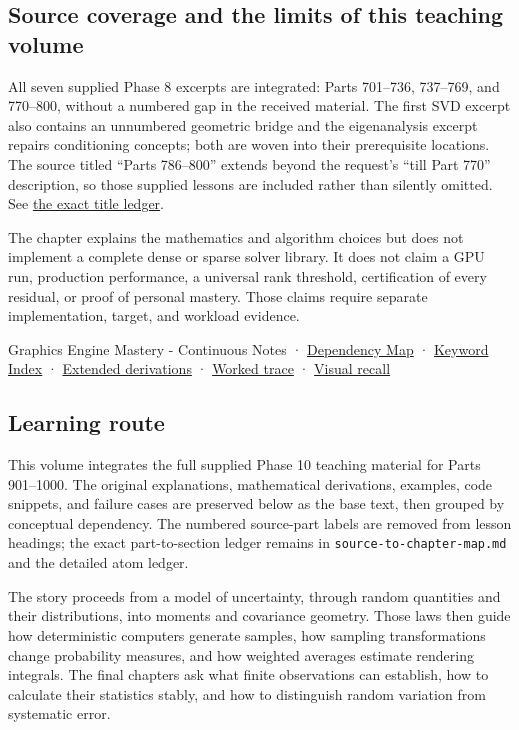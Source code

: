\subsection{Source coverage and the limits of this teaching volume}\label{02-foundations-ii-ch039-source-coverage-and-the-limits-of-this-teaching-volume}

All seven supplied Phase 8 excerpts are integrated: Parts 701--736, 737--769, and 770--800, without a numbered gap in the received material. The first SVD excerpt also contains an unnumbered geometric bridge and the eigenanalysis excerpt repairs conditioning concepts; both are woven into their prerequisite locations. The source titled ``Parts 786--800'' extends beyond the request's ``till Part 770'' description, so those supplied lessons are included rather than silently omitted. See \hyperref[appendix-fd090d982a15-phase-8---parts-701-800]{the exact title ledger}.

The chapter explains the mathematics and algorithm choices but does not implement a complete dense or sparse solver library. It does not claim a GPU run, production performance, a universal rank threshold, certification of every residual, or proof of personal mastery. Those claims require separate implementation, target, and workload evidence.

{Graphics Engine Mastery - Continuous Notes} · \hyperref[appendix-4ad47bdd269a]{Dependency Map} · \hyperref[appendix-a6d556a4ef50]{Keyword Index} · \hyperref[02-foundations-ii-ch039-phase-8---linear-systems-and-decompositions]{Extended derivations} · \hyperref[appendix-92ff77d4dfdc-phase-8---from-constraints-to-a-stable-svd-contract]{Worked trace} · \hyperref[appendix-932cf7182ff1]{Visual recall}

\subsection{Learning route}\label{02-foundations-ii-ch039-learning-route}

This volume integrates the full supplied Phase 10 teaching material for Parts 901--1000. The original explanations, mathematical derivations, examples, code snippets, and failure cases are preserved below as the base text, then grouped by conceptual dependency. The numbered source-part labels are removed from lesson headings; the exact part-to-section ledger remains in \texttt{source-to-chapter-map.md} and the detailed atom ledger.

The story proceeds from a model of uncertainty, through random quantities and their distributions, into moments and covariance geometry. Those laws then guide how deterministic computers generate samples, how sampling transformations change probability measures, and how weighted averages estimate rendering integrals. The final chapters ask what finite observations can establish, how to calculate their statistics stably, and how to distinguish random variation from systematic error.

